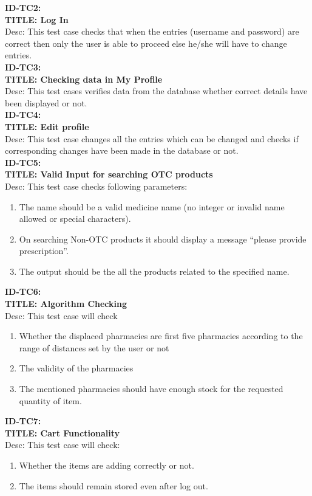 \documentclass{article}
\begin{document}
 \textbf{ID-TC2:}\\
 \textbf{TITLE: Log In}\\
Desc: This test case checks that when the entries (username and password) are correct then only the user is able to proceed else he/she will have to change entries.\\

 \textbf{ID-TC3:}\\
 \textbf{TITLE: Checking data in My Profile}\\
Desc: This test cases verifies data from the database whether correct details have been displayed or not.\\

 \textbf{ID-TC4:}\\
 \textbf{TITLE: Edit profile}\\
Desc: This test case changes all the entries which can be changed and checks if corresponding changes have been made in the database or not.\\

 \textbf{ID-TC5:}\\
 \textbf{TITLE: Valid Input for searching OTC products}\\
Desc: This test case checks following parameters:
\begin{enumerate}
\item The name should be a valid medicine name (no integer or invalid name allowed or special characters).
\item On searching Non-OTC products it should display a message “please provide prescription”.
\item The output should be the all the products related to the specified name.
\end{enumerate}

 \textbf{ID-TC6:}\\
\textbf{TITLE: Algorithm Checking}\\
Desc: This test case will check
\begin{enumerate} \item Whether the  displaced pharmacies are first five pharmacies according to the range of  distances set by the user or not 
\item The validity of the pharmacies
\item The mentioned pharmacies should have enough stock for the requested quantity of item.
\end{enumerate}

 \textbf{ID-TC7:}\\
 \textbf{TITLE: Cart Functionality}\\
Desc: This test case will check:
\begin{enumerate}
\item Whether the items are adding correctly or not.
\item The items should remain stored even after log out.
\end{enumerate}
\end{document}

